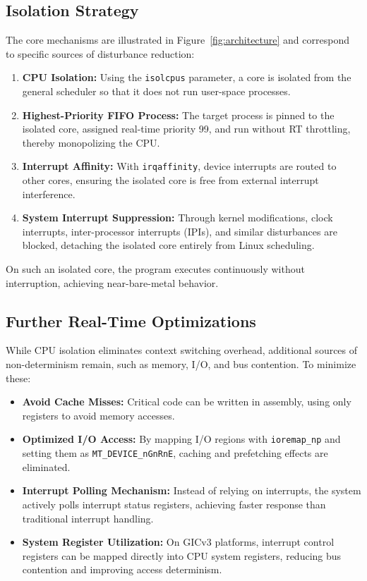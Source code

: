 \documentclass[letterpaper]{article}
\begin{document}
\subsection{Isolation Strategy}
The core mechanisms are illustrated in Figure~\ref{fig:architecture} and correspond to specific
sources of disturbance reduction:
\begin{enumerate}
    \item \textbf{CPU Isolation:} Using the \texttt{isolcpus} parameter, a core is isolated from the
    general scheduler so that it does not run user-space processes.
    \item \textbf{Highest-Priority FIFO Process:} The target process is pinned to the isolated core,
    assigned real-time priority 99, and run without RT throttling, thereby monopolizing the CPU.
    \item \textbf{Interrupt Affinity:} With \texttt{irqaffinity}, device interrupts are routed to other cores,
    ensuring the isolated core is free from external interrupt interference.
    \item \textbf{System Interrupt Suppression:} Through kernel modifications, clock interrupts,
    inter-processor interrupts (IPIs), and similar disturbances are blocked, detaching the isolated
    core entirely from Linux scheduling.
\end{enumerate}
On such an isolated core, the program executes continuously without interruption, achieving
near-bare-metal behavior.

\subsection{Further Real-Time Optimizations}
While CPU isolation eliminates context switching overhead, additional sources of non-determinism
remain, such as memory, I/O, and bus contention. To minimize these:
\begin{itemize}
    \item \textbf{Avoid Cache Misses:} Critical code can be written in assembly, using only registers
    to avoid memory accesses.
    \item \textbf{Optimized I/O Access:} By mapping I/O regions with \texttt{ioremap\_np} and setting
    them as \texttt{MT\_DEVICE\_nGnRnE}, caching and prefetching effects are eliminated.
    \item \textbf{Interrupt Polling Mechanism:} Instead of relying on interrupts, the system actively
    polls interrupt status registers, achieving faster response than traditional interrupt handling.
    \item \textbf{System Register Utilization:} On GICv3 platforms, interrupt control registers can
    be mapped directly into CPU system registers, reducing bus contention and improving access
    determinism.
\end{itemize}
\end{document}
